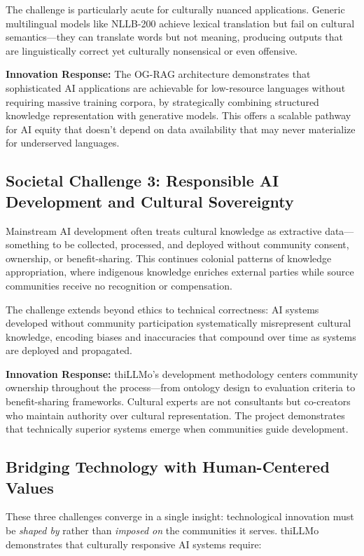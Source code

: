 \documentclass[11pt,a4paper]{article}
\begin{document}
The challenge is particularly acute for culturally nuanced applications. Generic multilingual models like NLLB-200 achieve lexical translation but fail on cultural semantics---they can translate words but not meaning, producing outputs that are linguistically correct yet culturally nonsensical or even offensive.

\textbf{Innovation Response:} The OG-RAG architecture demonstrates that sophisticated AI applications are achievable for low-resource languages without requiring massive training corpora, by strategically combining structured knowledge representation with generative models. This offers a scalable pathway for AI equity that doesn't depend on data availability that may never materialize for underserved languages.

\subsection*{Societal Challenge 3: Responsible AI Development and Cultural Sovereignty}

Mainstream AI development often treats cultural knowledge as extractive data---something to be collected, processed, and deployed without community consent, ownership, or benefit-sharing. This continues colonial patterns of knowledge appropriation, where indigenous knowledge enriches external parties while source communities receive no recognition or compensation.

The challenge extends beyond ethics to technical correctness: AI systems developed without community participation systematically misrepresent cultural knowledge, encoding biases and inaccuracies that compound over time as systems are deployed and propagated.

\textbf{Innovation Response:} thiLLMo's development methodology centers community ownership throughout the process---from ontology design to evaluation criteria to benefit-sharing frameworks. Cultural experts are not consultants but co-creators who maintain authority over cultural representation. The project demonstrates that technically superior systems emerge when communities guide development.

\subsection*{Bridging Technology with Human-Centered Values}

These three challenges converge in a single insight: technological innovation must be \emph{shaped by} rather than \emph{imposed on} the communities it serves. thiLLMo demonstrates that culturally responsive AI systems require:
\end{document}
